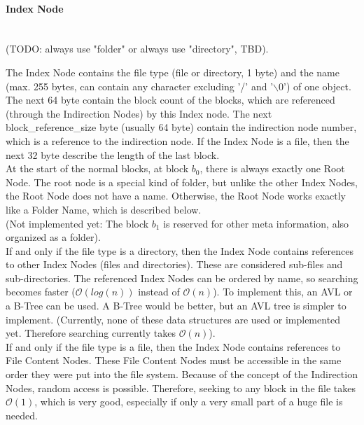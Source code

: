 \paragraph{Index Node} ~\\

(TODO: always use "folder" or always use "directory", TBD).

The Index Node contains the file type (file or directory, 1 byte) and the name (max. 255 bytes, can contain any character excluding '/' and '$\backslash0$') of one object. The next 64 byte contain the block count of the blocks, which are referenced  (through the Indirection Nodes) by this Index node. The next block\_reference\_size byte (usually 64 byte) contain the indirection node number, which is a reference to the indirection node. If the Index Node is a file, then the next 32 byte describe the length of the last block.\\


At the start of the normal blocks, at block $b_{0}$, there is always exactly one Root Node. The root node is a special kind of folder, but unlike the other Index Nodes, the Root Node does not have a name. Otherwise, the Root Node works exactly like a Folder Name, which is described below.\\

(Not implemented yet: The block $b_{1}$ is reserved for other meta information, also organized as a folder).\\

If and only if the file type is a directory, then the Index Node contains references to other Index Nodes (files and directories). These are considered sub-files and sub-directories. The referenced Index Nodes can be ordered by name, so searching becomes faster ($\mathcal{O}(log(n))$ instead of $\mathcal{O}(n)$). To implement this, an AVL or a B-Tree can be used. A B-Tree would be better, but an AVL tree is simpler to implement. (Currently, none of these data structures are used or implemented yet. Therefore searching currently takes $\mathcal{O}(n)$).\\

If and only if the file type is a file, then the Index Node contains references to File Content Nodes. These File Content Nodes must be accessible in the same order they were put into the file system. Because of the concept of the Indirection Nodes, random access is possible. Therefore, seeking to any block in the file takes $\mathcal{O}(1)$, which is very good, especially if only a very small part of a huge file is needed.\\

